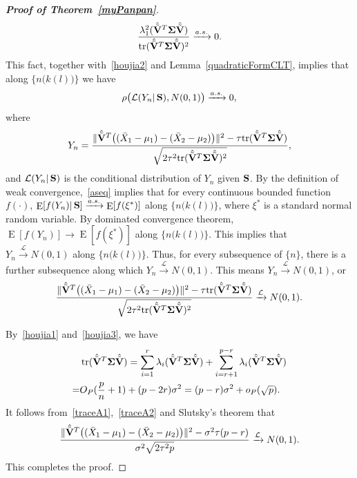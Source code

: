 \documentclass[review]{elsarticle}
\DeclareMathOperator{\mytr}{tr}
\DeclareMathOperator{\myE}{E}
\theoremstyle{plain}
\theoremstyle{definition}
\theoremstyle{remark}
\begin{document}
\begin{appendices}
\begin{proof}[\textbf{Proof of Theorem~\ref{myPanpan}}]
$$
\frac{\lambda_1^2(\hat{\tilde{\BV}}^T\bSigma\hat{\tilde{\BV}})}{\mytr(\hat{\tilde{\BV}}^T\bSigma\hat{\tilde{\BV}})^2}\xrightarrow{a.s.}0.
$$
This fact, together with~\eqref{houjia2} and Lemma~\ref{quadraticFormCLT}, implies that along $\big\{n\big(k(l)\big)\big\}$ we have
\begin{equation}\label{aseq}
    \rho\big(\mathcal{L}( Y_n |\,\mathbf{S}),N(0,1)\big)\xrightarrow{a.s.}0,
\end{equation}
where 
$$
Y_n=\frac{\|\hat{\tilde{\mathbf{V}}}^T\big((\bar{X}_1-\mu_1)-(\bar{X}_2-\mu_2)\big)\|^2-\tau\mathrm{tr}(\hat{\tilde{\mathbf{V}}}^T\boldsymbol{\Sigma}\hat{\tilde{\mathbf{V}}})}{\sqrt{2\tau^2\mathrm{tr}(\hat{\tilde{\mathbf{V}}}^T\boldsymbol{\Sigma}\hat{\tilde{\mathbf{V}}})^2}},
$$
and $\mathcal{L}(Y_n|\,\mathbf{S})$ is the conditional distribution of $Y_n$ given $\mathbf{S}$.
By the definition of weak convergence,~\eqref{aseq} implies that for every continuous bounded function $f(\cdot)$, $\myE[f(Y_n)|\,\BS]\xrightarrow{a.s.}\myE[f(\xi^*)]$ along $\big\{n\big(k(l)\big)\big\}$, where $\xi^*$ is a standard normal random variable.
By dominated convergence theorem, $\myE[f(Y_n)]\to \myE[f(\xi^*)]$ along $\big\{n\big(k(l)\big)\big\}$.
This implies that $Y_n\xrightarrow{\mathcal{L}}N(0,1)$ along $\big\{n\big(k(l)\big)\big\}$.
Thus, for every subsequence of $\{n\}$, there is a further subsequence along which
$Y_n\xrightarrow{\mathcal{L}}N(0,1)$.
This means $Y_n\xrightarrow{\mathcal{L}}N(0,1)$, or
$$
\frac{\|\hat{\tilde{\mathbf{V}}}^T\big((\bar{X}_1-\mu_1)-(\bar{X}_2-\mu_2)\big)\|^2-\tau\mathrm{tr}(\hat{\tilde{\mathbf{V}}}^T\boldsymbol{\Sigma}\hat{\tilde{\mathbf{V}}})}{\sqrt{2\tau^2\mathrm{tr}(\hat{\tilde{\mathbf{V}}}^T\boldsymbol{\Sigma}\hat{\tilde{\mathbf{V}}})^2}}\xrightarrow{\mathcal{L}}N(0,1).
$$


By~\eqref{houjia1} and~\eqref{houjia3}, we have
\begin{equation}\label{traceA2}
    \begin{aligned}
        &\mytr(\hat{\tilde{\BV}}^T\bSigma\hat{\tilde{\BV}})=
    \sum_{i=1}^r \lambda_i(\hat{\tilde{\BV}}^T\bSigma\hat{\tilde{\BV}})
    +
    \sum_{i=r+1}^{p-r} \lambda_i(\hat{\tilde{\BV}}^T\bSigma\hat{\tilde{\BV}})\\
        =&
    O_P(\frac{p}{n}+1)+(p-2r)\sigma^2
        =
        (p-r)\sigma^2+o_P(\sqrt{p}).
    \end{aligned}
\end{equation}
It follows from~\eqref{traceA1},~\eqref{traceA2} and Slutsky's theorem that
$$
\frac{\|\hat{\tilde{\mathbf{V}}}^T\big((\bar{X}_1-\mu_1)-(\bar{X}_2-\mu_2)\big)\|^2-\sigma^2\tau(p-r) }{\sigma^2\sqrt{2\tau^2 p}}\xrightarrow{\mathcal{L}}N(0,1).
$$
This completes the proof.
\end{proof}

\end{appendices}
\end{document}
